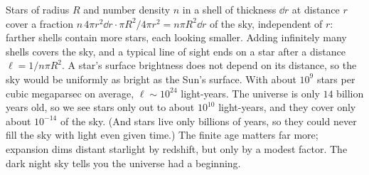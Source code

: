  Stars of radius $R$ and number density $n$ in a shell of thickness $\dd r$ at distance $r$ cover a fraction $n\,4\pi r^2\dd r\cdot\pi R^2/4\pi r^2 = n\pi R^2\dd r$ of the sky, independent of $r$: farther shells contain more stars, each looking smaller. Adding infinitely many shells covers the sky, and a typical line of sight ends on a star after a distance $\ell = 1/n\pi R^2$. A star's surface brightness does not depend on its distance, so the sky would be uniformly as bright as the Sun's surface. With about $10^9$ stars per cubic megaparsec on average, $\ell\sim10^{24}$ light-years. The universe is only $14$ billion years old, so we see stars only out to about $10^{10}$ light-years, and they cover only about $10^{-14}$ of the sky. (And stars live only billions of years, so they could never fill the sky with light even given time.) The finite age matters far more; expansion dims distant starlight by redshift, but only by a modest factor. The dark night sky tells you the universe had a beginning.
